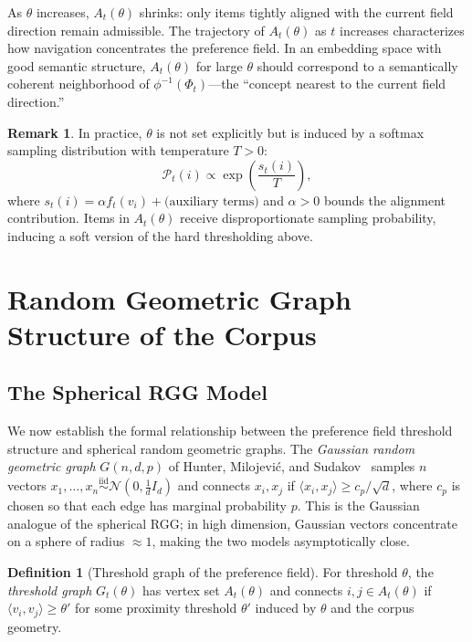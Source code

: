 \documentclass[12pt, a4paper]{article}
\theoremstyle{plain}
\theoremstyle{definition}
\newtheorem{definition}{Definition}[section]
\newtheorem{remark}{Remark}[section]
\begin{document}
As $\theta$ increases, $A_t(\theta)$ shrinks: only items tightly aligned
with the current field direction remain admissible. The trajectory of
$A_t(\theta)$ as $t$ increases characterizes how navigation concentrates the
preference field. In an embedding space with good semantic structure,
$A_t(\theta)$ for large $\theta$ should correspond to a semantically coherent
neighborhood of $\phi^{-1}(\Phi_t)$---the ``concept nearest to the current
field direction.''

\begin{remark}
In practice, $\theta$ is not set explicitly but is induced by a softmax
sampling distribution with temperature $T > 0$:
\begin{equation}
  \mathcal{P}_t(i) \propto \exp\!\left(\frac{s_t(i)}{T}\right),
\end{equation}
where $s_t(i) = \alpha f_t(v_i) + \text{(auxiliary terms)}$ and $\alpha >
0$ bounds the alignment contribution. Items in $A_t(\theta)$ receive
disproportionate sampling probability, inducing a soft version of the
hard thresholding above.
\end{remark}

\section{Random Geometric Graph Structure of the Corpus}
\label{sec:rgg}

\subsection{The Spherical RGG Model}

We now establish the formal relationship between the preference field
threshold structure and spherical random geometric graphs. The \textit{Gaussian
random geometric graph} $G(n, d, p)$ of Hunter, Milojević, and
Sudakov~\cite{hunter2026gaussian} samples $n$ vectors $x_1, \ldots, x_n
\overset{\text{iid}}{\sim} \mathcal{N}(0, \frac{1}{d}I_d)$ and connects
$x_i, x_j$ if $\langle x_i, x_j \rangle \ge c_p / \sqrt{d}$, where
$c_p$ is chosen so that each edge has marginal probability $p$. This is the
Gaussian analogue of the spherical RGG; in high dimension, Gaussian vectors
concentrate on a sphere of radius $\approx 1$, making the two models
asymptotically close.

\begin{definition}[Threshold graph of the preference field]
For threshold $\theta$, the \emph{threshold graph} $G_t(\theta)$ has
vertex set $A_t(\theta)$ and connects $i, j \in A_t(\theta)$ if
$\langle v_i, v_j \rangle \ge \theta'$ for some proximity threshold
$\theta'$ induced by $\theta$ and the corpus geometry.
\end{definition}
\end{document}
